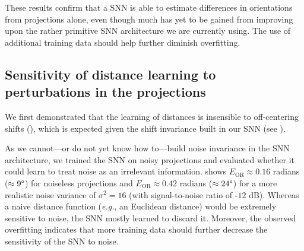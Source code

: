 These results confirm that a SNN is able to estimate differences in orientations from projections alone, even though much has yet to be gained from improving upon the rather primitive SNN architecture we are currently using.
The use of additional training data should help further diminish overfitting.


\subsection{Sensitivity of distance learning to perturbations in the projections}\label{sec:results:distance-estimation:sensitivity}


We first demonstrated that the learning of distances is insensible to off-centering shifts (), which is expected given the shift invariance built in our SNN (see ).

As we cannot---or do not yet know how to---build noise invariance in the SNN architecture, we trained the SNN on noisy projections and evaluated whether it could learn to treat noise as an irrelevant information.
 shows $E_\text{OR} \approx 0.16$ radians ($\approx 9\degree$) for noiseless projections and $E_\text{OR} \approx 0.42$ radians ($\approx 24\degree$) for a more realistic noise variance of $\sigma^2=16$ (with signal-to-noise ratio of -$12$ dB).
Whereas a naive distance function (\textit{e.g.}, an Euclidean distance) would be extremely sensitive to noise, the SNN mostly learned to discard it.
Moreover, the observed overfitting indicates that more training data should further decrease the sensitivity of the SNN to noise.

